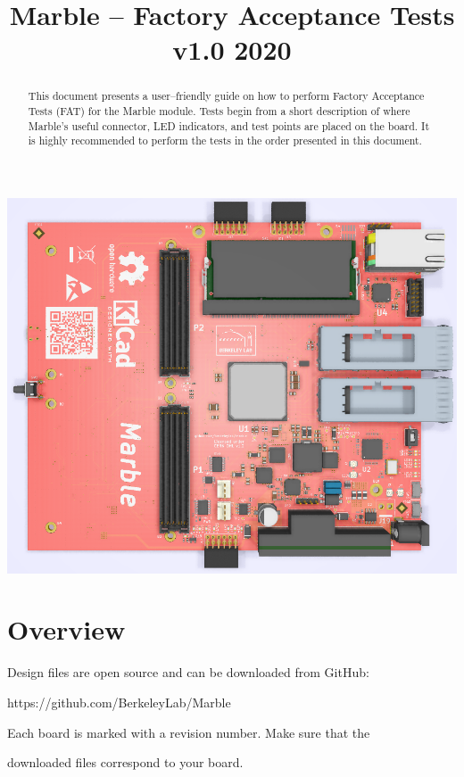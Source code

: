 \documentclass[12pt,oneside,a4]{article}
\title{Marble -- Factory Acceptance Tests\\ \small{v1.0 2020}}
\begin{document}
\maketitle
\begin{center}
\includegraphics[width=0.8\linewidth]{marble_top.png}
\end{center}
\begin{abstract}
This document presents a user--friendly guide on how to perform Factory Acceptance Tests (FAT) for the Marble module. Tests begin from a short description of where Marble's useful connector, LED indicators, and test points are placed on the board. It is highly recommended to perform the tests in the order presented in this document.
\end{abstract}

\clearpage
\tableofcontents

\clearpage

\section{Overview}

\begin{leftbar}
Design files are open source and can be downloaded from GitHub:

https://github.com/BerkeleyLab/Marble
\end{leftbar}


\begin{leftbar}
Each board is marked with a revision number. Make sure that the

downloaded files correspond to your board.
\end{leftbar}
\end{document}
